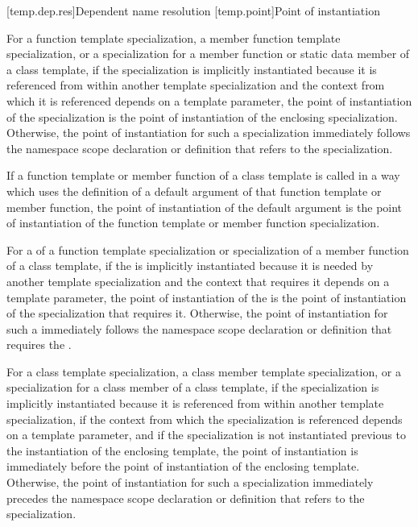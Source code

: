 [temp.dep.res]{Dependent name resolution}
[temp.point]{Point of instantiation}

\pnum
{}%
For a function template specialization, a member function template
specialization, or a specialization for a member function or static data member
of a class template,
if the specialization is implicitly instantiated because it is referenced
from within another template specialization and
the context from which it is referenced depends on a template parameter,
the point of instantiation of the specialization is the point of instantiation
of the enclosing specialization.
Otherwise, the point of instantiation for such a specialization immediately
follows the namespace scope declaration
or definition that refers to the specialization.

\pnum
If a function template or member function of a class template is called
in a way which uses the definition of a default argument of that function
template or member function,
the point of instantiation of the default argument is the point of
instantiation of the function template or member function specialization.

\pnum
For a  of a function template
specialization or specialization of a member function of a class template, if
the  is implicitly instantiated because
it is needed by another template specialization and the context that requires
it depends on a template parameter, the point of instantiation of the
 is the point of instantiation of the
specialization that requires it. Otherwise, the point of instantiation for such
a  immediately follows the namespace
scope declaration or definition that requires the
.



\pnum
For a class template specialization, a class member template specialization,
or a specialization for a class member of a class template,
if the specialization is implicitly instantiated because it is referenced
from within another template specialization,
if the context from which the specialization is referenced depends on a
template parameter,
and if the specialization is not instantiated previous to the instantiation of
the enclosing template,
the point of instantiation is immediately before the point of instantiation of
the enclosing template.
Otherwise, the point of instantiation for such a specialization immediately
precedes the namespace scope declaration
or definition that refers to the specialization.

